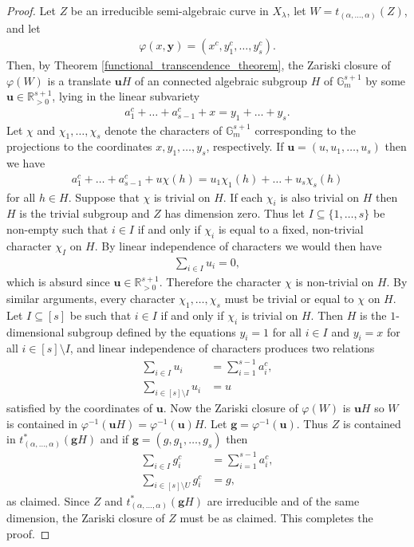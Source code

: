 \documentclass[10pt,a4paper]{amsart}
\newcommand{\G}{\mathbb{G}}
\newcommand{\R}{\mathbb{R}}
\renewcommand{\phi}{\varphi}
\renewcommand{\vec}[1]{\bm{#1}}
\begin{document}
\begin{proof}
    Let $Z$ be an irreducible semi-algebraic curve in $X_\lambda$, let $W = t_{(\alpha, \dots, \alpha)}(Z)$, and let
    \begin{align*}
        \phi(x, \vec{y}) = (x^c, y_1^c, \dots, y_s^c).
    \end{align*}
    Then, by Theorem \ref{functional_transcendence_theorem}, the Zariski closure of $\phi(W)$ is a translate $\vec{u} H$ of an connected algebraic subgroup $H$ of $\G_m^{s + 1}$ by some $\vec{u} \in \R_{>0}^{s + 1}$, lying in the linear subvariety
    \begin{align*}
        a_1^c + \dots + a_{s - 1}^c + x =
        y_1 + \dots + y_s.
    \end{align*}
    Let $\chi$ and $\chi_1, \dots, \chi_s$ denote the characters of $\G_m^{s + 1}$ corresponding to the projections to the coordinates $x, y_1, \dots, y_s$, respectively. If $\vec{u} = (u, u_1, \dots, u_s)$ then we have
    \begin{align*}
        a_1^c + \dots + a_{s - 1}^c + u\chi(h) =
        u_1\chi_1(h) + \dots + u_s\chi_s(h)
    \end{align*}
    for all $h \in H$. Suppose that $\chi$ is trivial on $H$. If each $\chi_i$ is also trivial on $H$ then $H$ is the trivial subgroup and $Z$ has dimension zero. Thus let $I \subseteq \{1, \dots, s\}$ be non-empty such that $i \in I$ if and only if $\chi_i$ is equal to a fixed, non-trivial character $\chi_I$ on $H$. By linear independence of characters we would then have
    \begin{align*}
        \sum_{i \in I} u_i = 0,
    \end{align*}
    which is absurd since $\vec{u} \in \R_{>0}^{s + 1}$. Therefore the character $\chi$ is non-trivial on $H$. By similar arguments, every character $\chi_1, \dots, \chi_s$ must be trivial or equal to $\chi$ on $H$. Let $I \subseteq [s]$ be such that $i \in I$ if and only if $\chi_i$ is trivial on $H$. Then $H$ is the $1$-dimensional subgroup defined by the equations $y_i = 1$ for all $i \in I$ and $y_i = x$ for all $i \in [s] \setminus I$, and linear independence of characters produces two relations
    \begin{align*}
        \sum_{i \in I} u_i &= \sum_{i = 1}^{s - 1} a_i^c, \\
        \sum_{i \in [s] \setminus I} 
        u_i &= u
    \end{align*}
    satisfied by the coordinates of $\vec{u}$. Now the Zariski closure of $\phi(W)$ is $\vec{u} H$ so $W$ is contained in $\phi^{-1}(\vec{u} H) = \phi^{-1}(\vec{u})H$. Let $\vec{g} = \phi^{-1}(\vec{u})$. Thus $Z$ is contained in $t_{(\alpha, \dots, \alpha)}^* (\vec{g}H)$ and if $\vec{g} = (g, g_1, \dots, g_s)$ then
    \begin{align*}
        \sum_{i \in I} g_i^c &= \sum_{i = 1}^{s - 1} a_i^c, \\
        \sum_{i \in [s] \setminus U} g_i^c &= g,
    \end{align*}
    as claimed. Since $Z$ and $t_{(\alpha, \dots, \alpha)}^* (\vec{g} H)$ are irreducible and of the same dimension, the Zariski closure of $Z$ must be as claimed. This completes the proof.
\end{proof}
\end{document}

